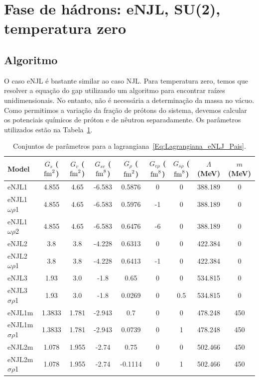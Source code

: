 \section{Fase de hádrons: eNJL, SU(2), temperatura zero}

\subsection{Algoritmo}

O caso eNJL é bastante similar ao caso NJL. Para temperatura zero, temos que resolver a equação do gap utilizando um algoritmo para encontrar raízes unidimensionais. No entanto, não é necessária a determinação da massa no vácuo. Como permitimos a variação da fração de prótons do sistema, devemos calcular os potenciais químicos de próton e de nêutron separadamente. Os parâmetros utilizados estão na Tabela~\ref{Tab:Parametros_eNJL}.

\begin{table}
\begin{tabular}{lcccccccc}
\toprule
Model & $G_s$ ($\rm{fm}^2$) & $G_v$ ($\rm{fm}^2$) & $G_{sv}$ ($\rm{fm}^8$) & $G_\rho$ ($\rm{fm}^2$) & $G_{v\rho}$ ($\rm{fm}^8$) & $G_{s\rho}$ ($\rm{fm}^8$) & $\Lambda$ (MeV) & $m$ (MeV) \\
\midrule
eNJL1 & 4.855 & 4.65 & -6.583 & 0.5876 & 0 & 0 & 388.189 & 0 \\
eNJL1$\omega\rho$1 & 4.855 & 4.65 & -6.583 & 0.5976 & -1 & 0 & 388.189 & 0 \\
eNJL1$\omega\rho$2 & 4.855 & 4.65 & -6.583 & 0.6476 & -6 & 0 & 388.189 & 0 \\
eNJL2 & 3.8 & 3.8 & -4.228 & 0.6313 & 0 & 0 & 422.384 & 0 \\
eNJL2$\omega\rho$1 & 3.8 & 3.8 & -4.228 & 0.6413 & -1 & 0 & 422.384 & 0 \\
eNJL3 & 1.93 & 3.0 & -1.8 & 0.65 & 0 & 0 & 534.815 & 0 \\
eNJL3$\sigma\rho$1 & 1.93 & 3.0 & -1.8 & 0.0269 & 0 & 0.5 & 534.815 & 0 \\
eNJL1m & 1.3833 & 1.781 & -2.943 & 0.7 & 0 & 0 & 478.248 & 450 \\
eNJL1m$\sigma\rho$1 & 1.3833 & 1.781 & -2.943 & 0.0739 & 0 & 1 & 478.248 & 450 \\
eNJL2m & 1.078 & 1.955 & -2.74 & 0.75 & 0 & 0 & 502.466 & 450 \\
eNJL2m$\sigma\rho$1 & 1.078 & 1.955 & -2.74 & -0.1114 & 0 & 1 & 502.466 & 450 \\
\bottomrule
\end{tabular}
\caption{Conjuntos de parâmetros para a lagrangiana~\eqref{Eq:Lagrangiana_eNLJ_Pais}. \label{Tab:Parametros_eNJL}}
\end{table}

